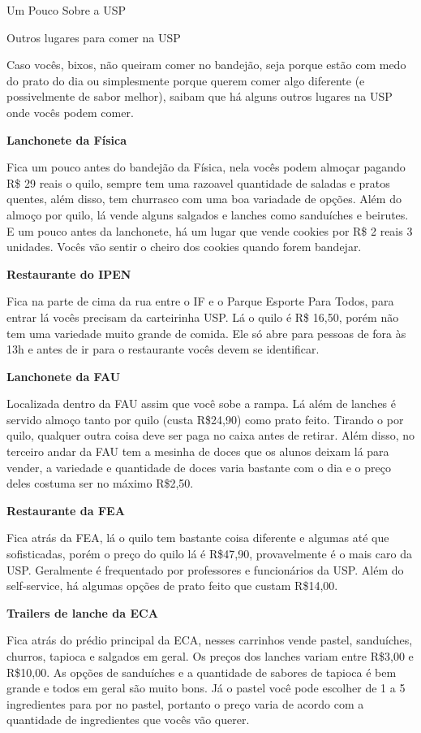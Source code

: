 \begin{secao}{Um Pouco Sobre a USP}
\begin{subsecao}{Outros lugares para comer na USP}

Caso vocês, bixos, não queiram comer no bandejão, seja porque estão com medo do prato do dia
ou simplesmente porque querem comer algo diferente (e possivelmente de sabor melhor), saibam
que há alguns outros lugares na USP onde vocês podem comer.

{\bf Lanchonete da Física}

Fica um pouco antes do bandejão da Física, nela vocês podem almoçar pagando R\$ 29 reais o
quilo, sempre tem uma razoavel quantidade de saladas e pratos quentes, além disso, tem
churrasco com uma boa variadade de opções.
Além do almoço por quilo, lá vende alguns salgados e lanches como sanduíches e beirutes.
E um pouco antes da lanchonete, há um lugar que vende cookies por R\$ 2 reais 3 unidades.
Vocês vão sentir o cheiro dos cookies quando forem bandejar.

{\bf Restaurante do IPEN}

Fica na parte de cima da rua entre o IF e o Parque Esporte Para Todos, para entrar lá vocês
precisam da carteirinha USP. Lá o quilo é R\$ 16,50, porém não tem uma variedade muito grande
de comida. Ele só abre para pessoas de fora às 13h e antes de ir para o restaurante vocês devem
se identificar.

{\bf Lanchonete da FAU}

Localizada dentro da FAU assim que você sobe a rampa. Lá além de lanches é servido almoço
tanto por quilo (custa R\$24,90) como prato feito. Tirando o por quilo, qualquer outra coisa
deve ser paga no caixa antes de retirar. Além disso, no terceiro andar da FAU tem a mesinha
de doces que os alunos deixam lá para vender, a variedade e quantidade de doces varia bastante
com o dia e o preço deles costuma ser no máximo R\$2,50.

{\bf Restaurante da FEA}

Fica atrás da FEA, lá o quilo tem bastante coisa diferente e algumas até que sofisticadas,
porém o preço do quilo lá é R\$47,90, provavelmente é o mais caro da USP. Geralmente
é frequentado por professores e funcionários da USP. Além do self-service, há algumas opções
de prato feito que custam R\$14,00.

{\bf Trailers de lanche da ECA}

Fica atrás do prédio principal da ECA, nesses carrinhos vende pastel, sanduíches, churros,
tapioca e salgados em geral. Os preços dos lanches variam entre R\$3,00 e R\$10,00. As opções de
sanduíches e a quantidade de sabores de tapioca é bem grande e todos em geral são muito bons.
Já o pastel você pode escolher de 1 a 5 ingredientes para por no pastel, portanto o preço
varia de acordo com a quantidade de ingredientes que vocês vão querer.


\end{subsecao}
\end{secao}
